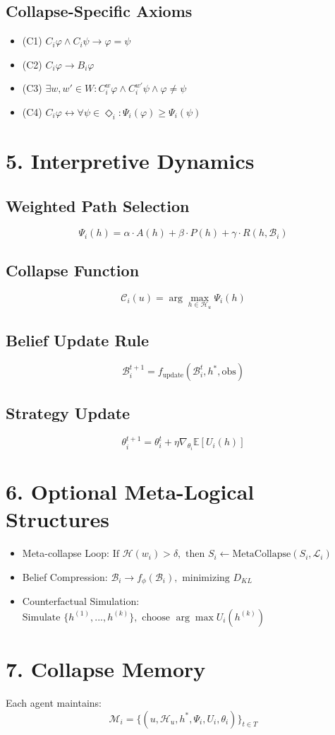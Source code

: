 \documentclass{article}
\begin{document}
\subsection*{Collapse-Specific Axioms}
\begin{itemize}
  \item (C1) \( C_i \varphi \wedge C_i \psi \rightarrow \varphi = \psi \)
  \item (C2) \( C_i \varphi \rightarrow B_i \varphi \)
  \item (C3) \( \exists w, w' \in W: C_i^w \varphi \wedge C_i^{w'} \psi \wedge \varphi \neq \psi \)
  \item (C4) \( C_i \varphi \leftrightarrow \forall \psi \in \Diamond_i: \Psi_i(\varphi) \geq \Psi_i(\psi) \)
\end{itemize}

\section*{5. Interpretive Dynamics}
\subsection*{Weighted Path Selection}
\[ \Psi_i(h) = \alpha \cdot A(h) + \beta \cdot P(h) + \gamma \cdot R(h, \mathcal{B}_i) \]

\subsection*{Collapse Function}
\[ \mathcal{C}_i(u) = \arg\max_{h \in \mathcal{H}_u} \Psi_i(h) \]

\subsection*{Belief Update Rule}
\[ \mathcal{B}_i^{t+1} = f_{\text{update}}(\mathcal{B}_i^t, h^*, \text{obs}) \]

\subsection*{Strategy Update}
\[ \theta_i^{t+1} = \theta_i^t + \eta \nabla_{\theta_i} \mathbb{E}[U_i(h)] \]

\section*{6. Optional Meta-Logical Structures}
\begin{itemize}
  \item Meta-collapse Loop: \( \text{If } \mathcal{H}(w_i) > \delta, \text{ then } S_i \leftarrow \text{MetaCollapse}(S_i, \mathcal{L}_i) \)
  \item Belief Compression: \( \mathcal{B}_i \rightarrow f_\phi(\mathcal{B}_i), \text{ minimizing } D_{KL} \)
  \item Counterfactual Simulation: \( \text{Simulate } \{h^{(1)}, ..., h^{(k)}\}, \text{ choose } \arg\max U_i(h^{(k)}) \)
\end{itemize}

\section*{7. Collapse Memory}
Each agent maintains:
\[
\mathcal{M}_i = \{(u, \mathcal{H}_u, h^*, \Psi_i, U_i, \theta_i)\}_{t \in T}
\]
\end{document}
